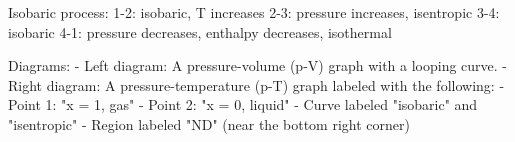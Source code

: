Isobaric process:  
1-2: isobaric, T increases  
2-3: pressure increases, isentropic  
3-4: isobaric  
4-1: pressure decreases, enthalpy decreases, isothermal  

Diagrams:  
- Left diagram: A pressure-volume (p-V) graph with a looping curve.  
- Right diagram: A pressure-temperature (p-T) graph labeled with the following:  
  - Point 1: "x = 1, gas"  
  - Point 2: "x = 0, liquid"  
  - Curve labeled "isobaric" and "isentropic"  
  - Region labeled "ND" (near the bottom right corner)